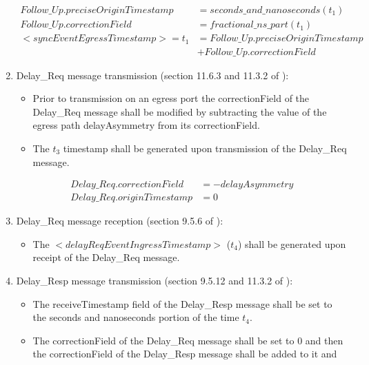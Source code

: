 \documentclass[a4paper, 12pt]{article}
\begin{document}
\begin{enumerate}
	\begin{align}
	  \label{eq:follow_up_tx}
	  Follow\_Up.preciseOriginTimestamp &= seconds\_and\_nanoseconds(t_1)\\
	  Follow\_Up.correctionField &=  fractional\_ns\_part(t_1)\\
	  <syncEventEgressTimestamp>= t_1 &= Follow\_Up.preciseOriginTimestamp \\
		\nonumber	     &+ Follow\_Up.correctionField
	\end{align}
  \item Delay\_Req message transmission (section 11.6.3 and 11.3.2 of \cite{IEEE1588}):
    \begin{itemize}
      \item Prior to transmission on an egress port the correctionField of 
	    the Delay\_Req message shall be modified by subtracting the value of the egress 
	    path delayAsymmetry from its correctionField.
      \item The $t_3$ timestamp shall be generated upon transmission of the Delay\_Req message.
    \end{itemize}
	  \begin{align}
	    \label{eq:follow_up_rx}
	    Delay\_Req.correctionField &= -delayAsymmetry \\
	    Delay\_Req.originTimestamp &= 0
	  \end{align}
  \item Delay\_Req message reception (section 9.5.6 of \cite{IEEE1588}):
    \begin{itemize}
      \item The $<delayReqEventIngressTimestamp>$ ($t_4$)  
	    shall be generated upon receipt of the Delay\_Req message.
    \end{itemize}
  \item Delay\_Resp message transmission (section 9.5.12 and 11.3.2 of \cite{IEEE1588}):
    \begin{itemize}
      \item The receiveTimestamp field of the Delay\_Resp message shall be set to the seconds and 
	    nanoseconds portion of the time $t_4$.
      \item The correctionField of the Delay\_Req message shall be set to 0 and then 
	    the correctionField of the Delay\_Resp message shall be added to it and

\end{itemize}
\end{enumerate}
\end{document}
